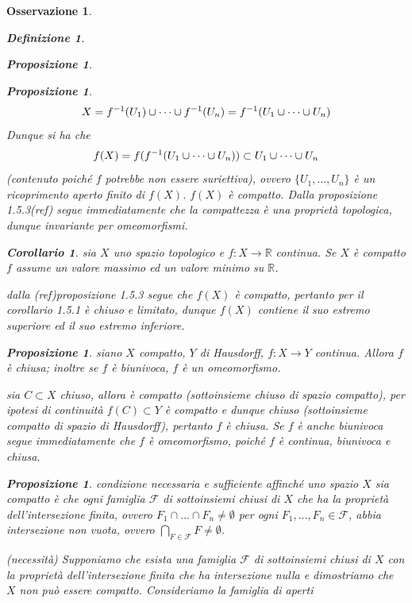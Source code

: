 \documentclass[oneside, 11pt]{amsbook}
\makeatletter
\newcommand{\0}{{(0)}}
\newcommand{\3}{{(3)}}
\theoremstyle{colonplain}
\newtheorem{prop}[thm]{Proposizione}
\newtheorem{cor}[thm]{Corollario}
\theoremstyle{colondefinition}
\newtheorem{defn}[thm]{Definizione}
\theoremstyle{colonremark}
\newtheorem{rmk}[thm]{Osservazione}
\numberwithin{equation}{chapter}
\renewcommand{\proofname}{Dimostrazione}
\renewenvironment{proof}[1][\proofname]{\par
  \pushQED{\end{proof}}%
  \normalfont \topsep6\p@\@plus6\p@\relax
  \trivlist
  \item[\hskip\labelsep\bfseries #1:]\ignorespaces
}{%
  \popQED\endtrivlist\@endpefalse
}
\makeatother
\begin{document}
\begin{rmk}
\begin{defn}
\begin{prop}
\begin{prop}
\begin{proof}
\begin{align}
    X = f^{-1}(U_1) \cup \dots \cup f^{-1}(U_n) = f^{-1}(U_1 \cup \dots \cup U_n) \notag
\end{align}
Dunque si ha che
\begin{align}
    f(X) = f(f^{-1}(U_1 \cup \dots \cup U_n)) \subset U_1 \cup \dots \cup U_n \notag
\end{align}
(contenuto poiché $f$ potrebbe non essere suriettiva), ovvero $\{ U_1, \dots, U_n\}$ è un ricoprimento aperto finito di $f(X)$. $f(X)$ è compatto.
\end{proof}
Dalla \textit{proposizione 1.5.3}(ref) segue immediatamente che la compattezza è una proprietà topologica, dunque invariante per omeomorfismi.
\begin{cor}
sia $X$ uno spazio topologico e $f : X \longrightarrow \mathbb{R}$ continua. Se $X$ è compatto $f$ assume un valore massimo ed un valore minimo su $\mathbb{R}$.
\end{cor}
\begin{proof}
dalla (ref)\textit{proposizione 1.5.3} segue che $f(X)$ è compatto, pertanto per il \textit{corollario 1.5.1} è chiuso e limitato, dunque $f(X)$ contiene il suo estremo superiore ed il suo estremo inferiore.
\end{proof}
\begin{prop}
siano $X$ compatto, $Y$ di Hausdorff, $f : X \longrightarrow Y$ continua. Allora $f$ è chiusa; inoltre se $f$ è biunivoca, $f$ è un omeomorfismo.
\end{prop}
\begin{proof}
sia $C \subset X$ chiuso, allora è compatto (sottoinsieme chiuso di spazio compatto), per ipotesi di continuità $f(C) \subset Y$ è compatto e dunque chiuso (sottoinsieme compatto di spazio di Hausdorff), pertanto $f$ è chiusa. Se $f$ è anche biunivoca segue immediatamente che $f$ è omeomorfismo, poiché $f$ è continua, biunivoca e chiusa.
\end{proof}
\begin{prop}
condizione \textit{necessaria} e \textit{sufficiente} affinché uno spazio $X$ sia compatto è che ogni famiglia $\mathcal{F}$ di sottoinsiemi chiusi di $X$ che ha la proprietà dell'intersezione finita, ovvero $F_1 \cap \dots \cap F_n \neq \emptyset$ per ogni $F_1, \dots, F_n \in \mathcal{F}$, abbia intersezione non vuota, ovvero $\bigcap_{F \in \mathcal{F}} F \neq \emptyset$.
\end{prop}
\begin{proof}
\textit{(necessità)} Supponiamo che esista una famiglia $\mathcal{F}$ di sottoinsiemi chiusi di $X$ con la proprietà dell'intersezione finita che ha intersezione nulla e dimostriamo che $X$ non può essere compatto. Consideriamo la famiglia di aperti

\end{proof}
\end{prop}
\end{prop}
\end{defn}
\end{rmk}
\end{document}

